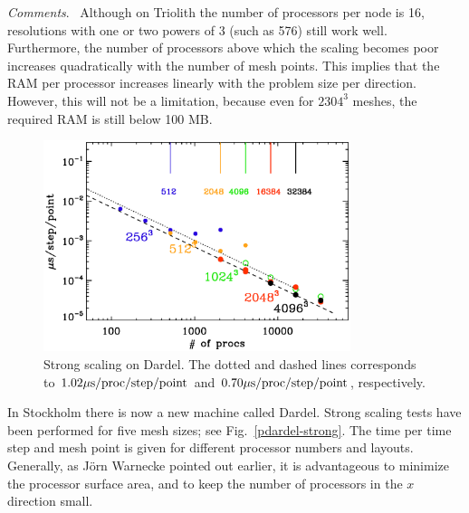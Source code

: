 \documentclass[\mydriver,12pt,twoside,notitlepage,a4paper]{article}
\newcommand{\Fig}[1]{Fig.~\ref{#1}}
\begin{document}
{\em Comments}.~
Although on Triolith the number of processors per node is 16,
resolutions with one or two powers of 3 (such as 576) still work well.
Furthermore, the number of processors above which the scaling becomes
poor increases quadratically with the number of mesh points.
This implies that the RAM per processor increases linearly with
the problem size per direction.
However, this will not be a limitation, because even for $2304^3$
meshes, the required RAM is still below 100 MB.

\begin{figure}[hbtp]
  \centering
  \includegraphics[width=0.8\textwidth,keepaspectratio]{pdardel-strong}
  \caption{Strong scaling on Dardel.
The dotted and dashed lines corresponds to
$1.02\mu{\rm s}/{\rm proc}/{\rm step}/{\rm point}$ and
$0.70\mu{\rm s}/{\rm proc}/{\rm step}/{\rm point}$, respectively.
}\label{ptriolith-strong}
\end{figure}

In Stockholm there is now a new machine called Dardel.
Strong scaling tests have been performed for five mesh sizes;
see \Fig{pdardel-strong}.
The time per time step and mesh point is given for
different processor numbers and layouts.
Generally, as J\"orn Warnecke pointed out earlier,
it is advantageous to minimize the
processor surface area, and to keep the number
of processors in the $x$ direction small.
\end{document}
